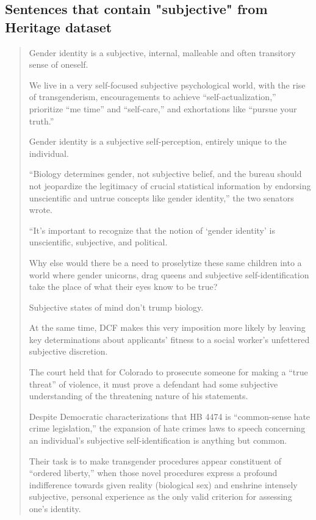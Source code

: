 \documentclass[11pt]{article}
\begin{document}
\subsection{Sentences that contain "subjective" from Heritage dataset}
\label{sec:orgd0935db}
\begin{quote}
Gender identity is a subjective, internal, malleable and often transitory sense of oneself.

We live in a very self-focused subjective psychological world, with the rise of transgenderism, encouragements to achieve “self-actualization,” prioritize “me time” and “self-care,” and exhortations like “pursue your truth.”

Gender identity is a subjective self-perception, entirely unique to the individual.

“Biology determines gender, not subjective belief, and the bureau should not jeopardize the legitimacy of crucial statistical information by endorsing unscientific and untrue concepts like gender identity,” the two senators wrote.

“It’s important to recognize that the notion of ‘gender identity’ is unscientific, subjective, and political.

Why else would there be a need to proselytize these same children into a world where gender unicorns, drag queens and subjective self-identification take the place of what their eyes know to be true?

Subjective states of mind don’t trump biology.

At the same time, DCF makes this very imposition more likely by leaving key determinations about applicants’ fitness to a social worker’s unfettered subjective discretion.

The court held that for Colorado to prosecute someone for making a “true threat” of violence, it must prove a defendant had some subjective understanding of the threatening nature of his statements.

Despite Democratic characterizations that HB 4474 is “common-sense hate crime legislation,” the expansion of hate crimes laws to speech concerning an individual’s subjective self-identification is anything but common.

Their task is to make transgender procedures appear constituent of “ordered liberty,” when those novel procedures express a profound indifference towards given reality (biological sex) and enshrine intensely subjective, personal experience as the only valid criterion for assessing one’s identity.


\end{quote}
\end{document}
